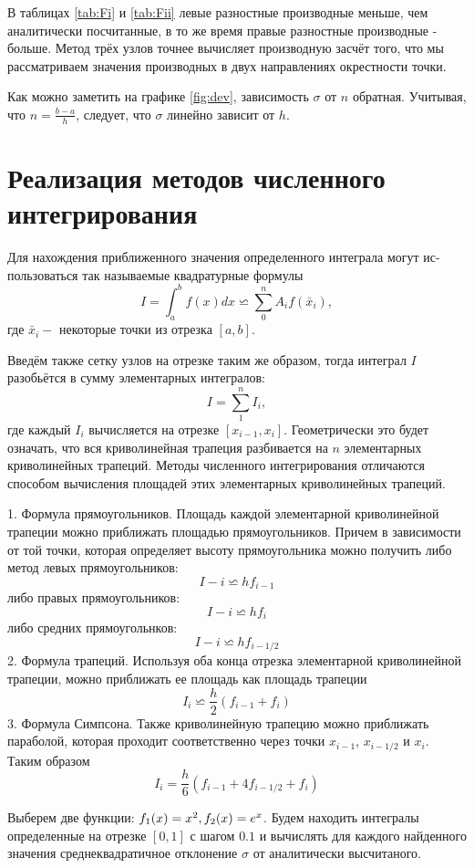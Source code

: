 \documentclass{article}
\begin{document}
В таблицах \ref{tab:Fi} и \ref{tab:Fii} левые разностные производные меньше,
чем аналитически посчитанные, в то же время правые разностные производные - больше.
Метод трёх узлов точнее вычисляет производную засчёт того, что мы рассматриваем
значения производных в двух направлениях окрестности точки.

Как можно заметить на графике \ref{fig:dev}, зависимость $\sigma$ от $n$ обратная.
Учитывая, что $n = \frac{b-a}{h}$, следует, что $\sigma$ линейно зависит от $h$.

\section{Реализация методов численного интегрирования}

Для нахождения приближенного значения определенного интеграла могут ис- пользоваться так называемые квадратурные формулы
$$I=\int_a^b f(x)dx\backsimeq \sum_0^n A_i f(\bar x_i),$$
где $\bar x_i-$ некоторые точки из отрезка $[a,b]$.
\vspace{5mm}

Введём также сетку узлов на отрезке таким же образом,
тогда интеграл $I$ разобьётся в сумму элементарных интегралов:
$$I=\sum_1^nI_i,$$
где каждый $I_i$ вычисляется на отрезке $[x_{i-1},x_i]$. Геометрически это будет означать, что вся криволинейная трапеция разбивается на $n$ элементарных криволинейных трапеций. Методы численного интегрирования отличаются способом вычисления площадей этих элементарных криволинейных трапеций.

1. Формула прямоугольников. Площадь каждой элементарной криволинейной трапеции можно приближать площадью прямоугольников. Причем в зависимости от той точки, которая определяет высоту прямоугольника можно получить либо метод левых прямоугольников:
$$I-i \backsimeq hf_{i-1}$$
либо правых прямоугольников:
$$I-i \backsimeq hf_{i}$$
либо средних прямоугольнков:
$$I-i \backsimeq hf_{i-1/2}$$
2. Формула трапеций. Используя оба конца отрезка элементарной криволинейной трапеции, можно приближать ее площадь как площадь трапеции
$$I_i \backsimeq \frac{h}{2}(f_{i-1}+f_i)$$
3. Формула Симпсона. Также криволинейную трапецию можно приближать параболой, которая проходит
соответственно через точки $x_{i-1}$, $x_{i-1/2}$ и $x_i$. Таким образом
$$I_i = \frac{h}{6}(f_{i-1} + 4f_{i-1/2}+f_i)$$

Выберем две функции: $f_1(x) = x^2, f_2(x) = e^x$. Будем находить интегралы определенные
на отрезке $[0, 1]$ с шагом $0.1$ и вычислять для каждого найденного значения среднеквадратичное отклонение $\sigma$ от аналитически высчитаного.
\end{document}
